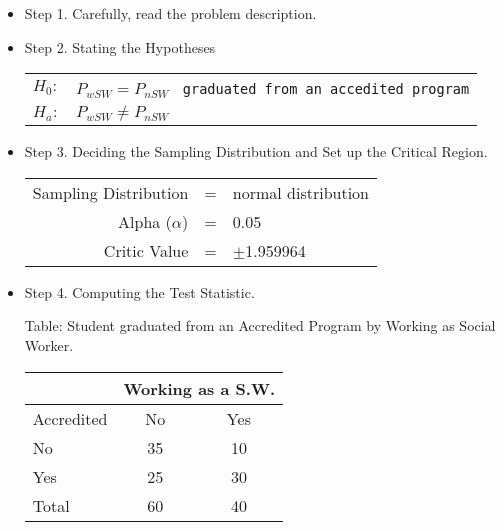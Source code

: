 \documentclass[11pt]{book}\usepackage[]{graphicx}\usepackage[]{color}
\begin{document}
\begin{itemize}
\item Step 1. Carefully, read the problem description.

\item Step 2. Stating the Hypotheses

\begin{center}
\begin{tabular}{@{} ll @{}}
$H_0:$ & $P_{wSW} = P_{nSW}$ \texttt{  graduated from an accedited program} \\
$H_a:$ & $P_{wSW} \ne P_{nSW}$
\end{tabular}
\end{center}

\item Step 3. Deciding the Sampling Distribution and Set up the Critical Region.

\begin{tabular}{@{} rcl @{}}
Sampling Distribution & = & normal distribution \\
Alpha ($\alpha$)      & = & 0.05 \\
Critic Value          & = & $\pm$1.959964
\end{tabular}

\newpage

\item Step 4.  Computing the Test Statistic.

\begin{minipage}[h]{6cm}

Table: Student graduated from an Accredited Program by Working as Social Worker.

      \begin{tabular}{@{} l c c @{}}
     &  \multicolumn{2}{c}{ Working as a S.W. } \\ \hline
     Accredited   & No & Yes \\ \hline
     No           & 35 & 10 \\
     Yes          & 25 & 30 \\ \hline
     Total        & 60 & 40 \\ \hline
   \end{tabular}


\end{minipage}
\end{itemize}
\end{document}
